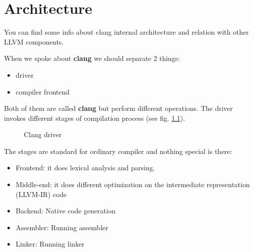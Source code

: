 \chapter{Architecture}

You can find some info about clang internal architecture and relation
with other LLVM components.

When we spoke about \textbf{clang} we should separate 2 things:
\begin{itemize}
\item driver
\item compiler frontend 
\end{itemize}
Both of them are called \textbf{clang} but perform different
operations. The driver invokes different stages of compilation process
(see fig. \ref{fig:clang_driver}). 
\begin{figure}
\begin{center}
\end{center}
  \caption{Clang driver}
  \label{fig:clang_driver}
\end{figure}
The stages are standard for ordinary compiler and nothing special is
there:
\begin{itemize}
\item Frontend: it does lexical analysis and parsing.
\item Middle-end: it does different optimization on the intermediate
  representation (LLVM-IR) code
\item Backend: Native code generation
\item Assembler: Running assembler
\item Linker: Running linker
\end{itemize}

